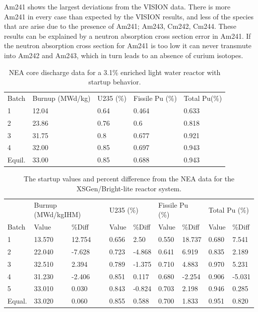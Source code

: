 \documentclass{article}
\begin{document}
Am241 shows the largest deviations from the VISION data. There is more Am241 in every case than expected by the VISION results, and less of the species that are arise due to the presence of Am241; Am243, Cm242, Cm244. These results can be explained by a neutron absorption cross section error in Am241. If the neutron absorption cross section for Am241 is too low it can never transmute into Am242 and Am243, which in turn leads to an absence of curium isotopes.

\begin{table}[!htb]
\centering
\caption{NEA core discharge data for a 3.1\% enriched light water reactor with startup behavior.}
\label{tab:b}
\begin{tabular}{lllll}
Batch & Burnup (MWd/kg) & U235 (\%) & Fissile Pu (\%) & Total Pu(\%) \\
1 & 12.04 & 0.64 & 0.464 & 0.633 \\
2 & 23.86 & 0.76 & 0.6 & 0.818 \\
3 & 31.75 & 0.8 & 0.677 & 0.921 \\
4 & 32.00 & 0.85 & 0.697 & 0.943 \\
Equil. & 33.00 & 0.85 & 0.688 & 0.943
\end{tabular}
\end{table}

\begin{table}[!htb]
\centering
\caption{The startup values and percent difference from the NEA data for the XSGen/Bright-lite reactor system.}
\label{tab:c}
\begin{tabular}{lllllllll}
 & \multicolumn{2}{l}{Burnup (MWd/kgIHM)} & \multicolumn{2}{l}{U235 (\%)} & \multicolumn{2}{l}{Fissile Pu (\%)} & \multicolumn{2}{l}{Total Pu (\%)} \\
Batch & Value & \%Diff & Value & \%Diff & Value & \%Diff & Value & \%Diff \\
1 & 13.570 & 12.754 & 0.656 & 2.50 & 0.550 & 18.737 & 0.680 & 7.541 \\
2 & 22.040 & -7.628 & 0.723 & -4.868 & 0.641 & 6.919 & 0.835 & 2.189 \\
3 & 32.510 & 2.394 & 0.789 & -1.375 & 0.710 & 4.883 & 0.970 & 5.231 \\
4 & 31.230 & -2.406 & 0.851 & 0.117 & 0.680 & -2.254 & 0.906 & -5.031 \\
5 & 33.010 & 0.030 & 0.843 & -0.824 & 0.703 & 2.198 & 0.946 & 0.285 \\
Equal. & 33.020 & 0.060 & 0.855 & 0.588 & 0.700 & 1.833 & 0.951 & 0.820
\end{tabular}
\end{table}
\end{document}
